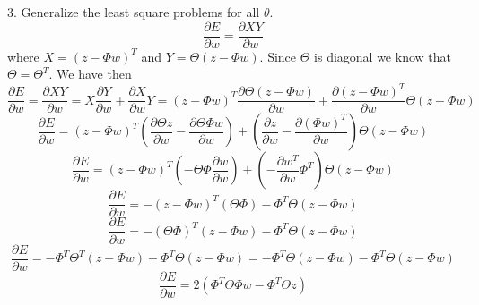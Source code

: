 3. Generalize the least square problems for all $\theta$.
\[
\frac{\partial E}{\partial w}=\frac{\partial XY}{\partial w}
\]
where $X=\left(z-\Phi w\right)^{T}$ and $Y=\Theta\left(z-\Phi w\right)$.
Since $\Theta$ is diagonal we know that $\Theta=\Theta^{T}$. We
have then
\[
\frac{\partial E}{\partial w}=\frac{\partial XY}{\partial w}=X\frac{\partial
Y}{\partial w}+\frac{\partial X}{\partial w}Y=\left(z-\Phi
w\right)^{T}\frac{\partial\Theta\left(z-\Phi w\right)}{\partial
w}+\frac{\partial\left(z-\Phi w\right)^{T}}{\partial w}\Theta\left(z-\Phi
w\right)
\]
\[
\frac{\partial E}{\partial w}=\left(z-\Phi
w\right)^{T}\left(\frac{\partial\Theta z}{\partial w}-\frac{\partial\Theta\Phi
w}{\partial w}\right)+\left(\frac{\partial z}{\partial w}-\frac{\partial(\Phi
w)^{T}}{\partial w}\right)\Theta\left(z-\Phi w\right)
\]
\[
\frac{\partial E}{\partial w}=\left(z-\Phi
w\right)^{T}\left(-\Theta\Phi\frac{\partial w}{\partial
w}\right)+\left(-\frac{\partial w{}^{T}}{\partial
w}\Phi^{T}\right)\Theta\left(z-\Phi w\right)
\]
\[
\frac{\partial E}{\partial w}=-\left(z-\Phi
w\right)^{T}\left(\Theta\Phi\right)-\Phi^{T}\Theta\left(z-\Phi w\right)
\]
\[
\frac{\partial E}{\partial w}=-\left(\Theta\Phi\right)^{T}\left(z-\Phi
w\right)-\Phi^{T}\Theta\left(z-\Phi w\right)
\]
\[
\frac{\partial E}{\partial w}=-\Phi^{T}\Theta^{T}\left(z-\Phi
w\right)-\Phi^{T}\Theta\left(z-\Phi w\right)=-\Phi^{T}\Theta\left(z-\Phi
w\right)-\Phi^{T}\Theta\left(z-\Phi w\right)
\]
\[
\frac{\partial E}{\partial w}=2\left(\Phi^{T}\Theta\Phi w-\Phi^{T}\Theta
z\right)
\] 
